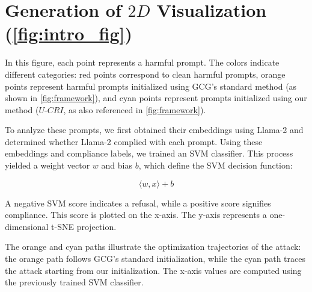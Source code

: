 \newpage
\appendix
\onecolumn

\section{Generation of $2D$ Visualization (\cref{fig:intro_fig})}
\label{appendix:intro_fig_explanation}

In this figure, each point represents a harmful prompt. The colors indicate different categories: red points correspond to clean harmful prompts, orange points represent harmful prompts initialized using GCG's standard method (as shown in \cref{fig:framework}), and cyan points represent prompts initialized using our method ($U\text{-}CRI$, as also referenced in \cref{fig:framework}).  

To analyze these prompts, we first obtained their embeddings using Llama-2 and determined whether Llama-2 complied with each prompt. Using these embeddings and compliance labels, we trained an SVM classifier. This process yielded a weight vector \( w \) and bias \( b \), which define the SVM decision function:

\[
\langle w, x \rangle + b
\]

A negative SVM score indicates a refusal, while a positive score signifies compliance. This score is plotted on the x-axis. The y-axis represents a one-dimensional t-SNE projection.

The orange and cyan paths illustrate the optimization trajectories of the attack: the orange path follows GCG’s standard initialization, while the cyan path traces the attack starting from our initialization. The x-axis values are computed using the previously trained SVM classifier.





